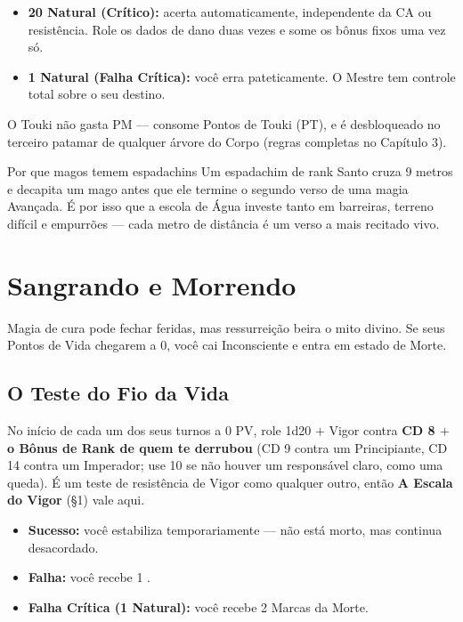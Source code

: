 \begin{itemize}
    \item \textbf{20 Natural (Crítico):} acerta automaticamente, independente da CA ou
          resistência. Role os dados de dano duas vezes e some os bônus fixos uma vez só.
    \item \textbf{1 Natural (Falha Crítica):} você erra pateticamente. O Mestre tem controle
          total sobre o seu destino.
\end{itemize}

O Touki não gasta PM --- consome Pontos de Touki (PT), e é desbloqueado no terceiro patamar
de qualquer árvore do Corpo (regras completas no Capítulo 3).

\begin{nota}{Por que magos temem espadachins}
    Um espadachim de rank Santo cruza 9 metros e decapita um mago antes que ele termine o
    segundo verso de uma magia Avançada. É por isso que a escola de Água investe tanto em
    barreiras, terreno difícil e empurrões --- cada metro de distância é um verso a mais
    recitado vivo.
\end{nota}

\section{Sangrando e Morrendo}

Magia de cura pode fechar feridas, mas ressurreição beira o mito divino. Se seus Pontos de
Vida chegarem a 0, você cai Inconsciente e entra em estado de Morte.

\subsection{O Teste do Fio da Vida}

No início de cada um dos seus turnos a 0 PV, role 1d20 $+$ Vigor contra \textbf{CD 8 $+$ o
Bônus de Rank de quem te derrubou} (CD 9 contra um Principiante, CD 14 contra um Imperador;
use 10 se não houver um responsável claro, como uma queda). É um teste de resistência de
Vigor como qualquer outro, então \textbf{A Escala do Vigor} (§1) vale aqui.

\begin{itemize}
    \item \textbf{Sucesso:} você estabiliza temporariamente --- não está morto, mas continua
          desacordado.
    \item \textbf{Falha:} você recebe 1 .
    \item \textbf{Falha Crítica (1 Natural):} você recebe 2 Marcas da Morte.
\end{itemize}

